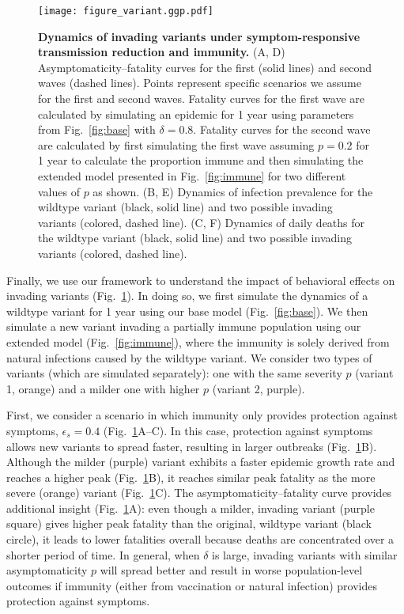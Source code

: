 \documentclass[12pt]{article}
\newcommand{\fref}[1]{Fig.~\ref{fig:#1}}
\begin{document}
\begin{figure}[!ht]
\texttt{[image: figure\_variant.ggp.pdf]}
\caption{
\textbf{Dynamics of invading variants under symptom-responsive transmission reduction and immunity.}
(A, D) Asymptomaticity--fatality curves for the first (solid lines) and second waves (dashed lines).
Points represent specific scenarios we assume for the first and second waves.
Fatality curves for the first wave are calculated by simulating an epidemic for 1 year using parameters from \fref{base} with $\delta=0.8$.
Fatality curves for the second wave are calculated by first simulating the first wave assuming $p=0.2$ for 1 year to calculate the proportion immune and then simulating the extended model presented in \fref{immune} for two different values of $p$ as shown.
(B, E) Dynamics of infection prevalence for the wildtype variant (black, solid line) and two possible invading variants (colored, dashed line).
(C, F) Dynamics of daily deaths for the wildtype variant (black, solid line) and two possible invading variants (colored, dashed line).
}
\label{fig:variant}
\end{figure}

Finally, we use our framework to understand the impact of behavioral effects on invading variants (\fref{variant}).
In doing so, we first simulate the dynamics of a wildtype variant for 1 year using our base model (\fref{base}).
We then simulate a new variant invading a partially immune population using our extended model (\fref{immune}), where the immunity is solely derived from natural infections caused by the wildtype variant.
We consider two types of variants (which are simulated separately): one with the same severity $p$ (variant 1, orange) and a milder one with higher $p$ (variant 2, purple).

First, we consider a scenario in which immunity only provides protection against symptoms, $\epsilon_s = 0.4$ (\fref{variant}A--C).
In this case, protection against symptoms allows new variants to spread faster, resulting in larger outbreaks (\fref{variant}B).
Although the milder (purple) variant exhibits a faster epidemic growth rate and reaches a higher peak (\fref{variant}B), it reaches similar peak fatality as the more severe (orange) variant (\fref{variant}C).
The asymptomaticity--fatality curve provides additional insight (\fref{variant}A): even though a milder, invading variant (purple square) gives higher peak fatality than the original, wildtype variant (black circle), it leads to lower fatalities overall because deaths are concentrated over a shorter period of time.
In general, when $\delta$ is large, invading variants with similar asymptomaticity $p$ will spread better and result in worse population-level outcomes if immunity (either from vaccination or natural infection) provides protection against symptoms.
\end{document}
